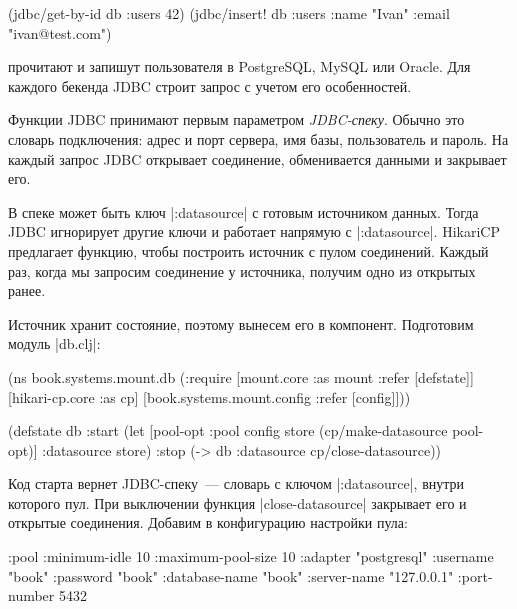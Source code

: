 \begin{english}
  \begin{clojure}
(jdbc/get-by-id db :users 42)
(jdbc/insert! db :users {:name "Ivan" :email "ivan@test.com"})
  \end{clojure}
\end{english}

\noindent
прочитают и запишут пользователя в PostgreSQL, MySQL или Oracle. Для каждого
бекенда JDBC строит запрос с учетом его особенностей.

Функции JDBC принимают первым параметром \emph{JDBC-спеку}. Обычно это словарь
подключения: адрес и порт сервера, имя базы, пользователь и пароль. На каждый
запрос JDBC открывает соединение, обменивается данными и закрывает его.

В спеке может быть ключ \spverb|:datasource| с готовым источником
данных. Тогда JDBC игнорирует другие ключи и работает напрямую с
\spverb|:datasource|. HikariCP предлагает функцию, чтобы построить источник с
пулом соединений. Каждый раз, когда мы запросим соединение у источника, получим
одно из открытых ранее.

Источник хранит состояние, поэтому вынесем его в компонент. Подготовим модуль
\spverb|db.clj|:

\begin{english}
  \begin{clojure}
(ns book.systems.mount.db
  (:require
   [mount.core :as mount :refer [defstate]]
   [hikari-cp.core :as cp]
   [book.systems.mount.config :refer [config]]))

(defstate db
  :start
  (let [{pool-opt :pool} config
        store (cp/make-datasource pool-opt)]
    {:datasource store})
  :stop
  (-> db :datasource cp/close-datasource))
  \end{clojure}
\end{english}

Код старта вернет JDBC-спеку~--- словарь с ключом \spverb|:datasource|, внутри
которого пул. При выключении функция \spverb|close-datasource| закрывает его и
открытые соединения. Добавим в конфигурацию настройки пула:

\begin{english}
  \begin{clojure}
{:pool {:minimum-idle       10
        :maximum-pool-size  10
        :adapter            "postgresql"
        :username           "book"
        :password           "book"
        :database-name      "book"
        :server-name        "127.0.0.1"
        :port-number        5432}}
  \end{clojure}
\end{english}

